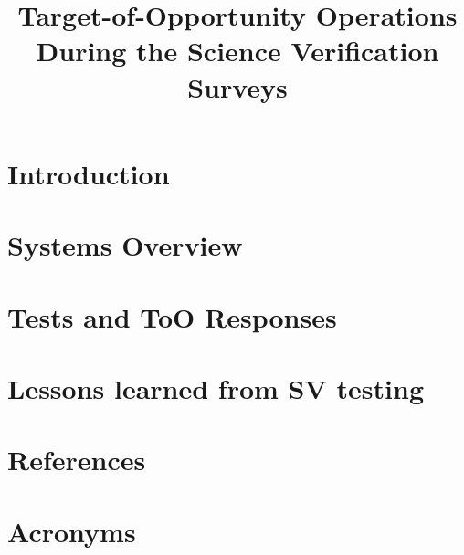 \documentclass[OPS,lsstdraft,authoryear,toc]{lsstdoc}
\title{Target-of-Opportunity Operations During the Science Verification Surveys}
\date{\vcsDate}
\begin{document}
\maketitle
\section{Introduction}\label{sec:introduction}

\newpage
\section{Systems Overview}\label{sec:sysOverview}

% 
\newpage
% 
\section{Tests and ToO Responses}\label{sec:ToOEvents}

\newpage
\section{Lessons learned from SV testing}\label{sec:LessonsLearned}


\appendix
\newpage
\section{References} \label{sec:bib}
\renewcommand{\refname}{} %


\newpage
\section{Acronyms} \label{sec:acronyms}

\end{document}
